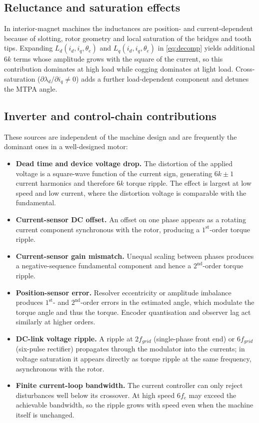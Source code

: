 \documentclass[11pt,a4paper]{article}
\newcommand{\thetae}{\theta_{e}}
\begin{document}
\subsection{Reluctance and saturation effects}

In interior-magnet machines the inductances are position- and
current-dependent because of slotting, rotor geometry and local saturation of
the bridges and tooth tips. Expanding $L_{d}(i_d,i_q,\thetae)$ and
$L_{q}(i_d,i_q,\thetae)$ in \eqref{eq:decomp} yields additional $6k$ terms whose
amplitude grows with the square of the current, so this contribution dominates
at high load while cogging dominates at light load. Cross-saturation
($\partial\lambda_{d}/\partial i_{q}\neq 0$) adds a further load-dependent
component and detunes the MTPA angle.

\subsection{Inverter and control-chain contributions}

These sources are independent of the machine design and are frequently the
dominant ones in a well-designed motor:

\begin{itemize}
\item \textbf{Dead time and device voltage drop.} The distortion of the applied
      voltage is a square-wave function of the current sign, generating
      $6k\pm1$ current harmonics and therefore $6k$ torque ripple. The effect
      is largest at low speed and low current, where the distortion voltage is
      comparable with the fundamental.
\item \textbf{Current-sensor DC offset.} An offset on one phase appears as a
      rotating current component synchronous with the rotor, producing a
      $1^{\text{st}}$-order torque ripple.
\item \textbf{Current-sensor gain mismatch.} Unequal scaling between phases
      produces a negative-sequence fundamental component and hence a
      $2^{\text{nd}}$-order torque ripple.
\item \textbf{Position-sensor error.} Resolver eccentricity or amplitude
      imbalance produces $1^{\text{st}}$- and $2^{\text{nd}}$-order errors in
      the estimated angle, which modulate the torque angle and thus the torque.
      Encoder quantisation and observer lag act similarly at higher orders.
\item \textbf{DC-link voltage ripple.} A ripple at $2f_{grid}$ (single-phase
      front end) or $6f_{grid}$ (six-pulse rectifier) propagates through the
      modulator into the currents; in voltage saturation it appears directly as
      torque ripple at the same frequency, asynchronous with the rotor.
\item \textbf{Finite current-loop bandwidth.} The current controller can only
      reject disturbances well below its crossover. At high speed $6f_{e}$ may
      exceed the achievable bandwidth, so the ripple grows with speed even
      when the machine itself is unchanged.
\end{itemize}
\end{document}
